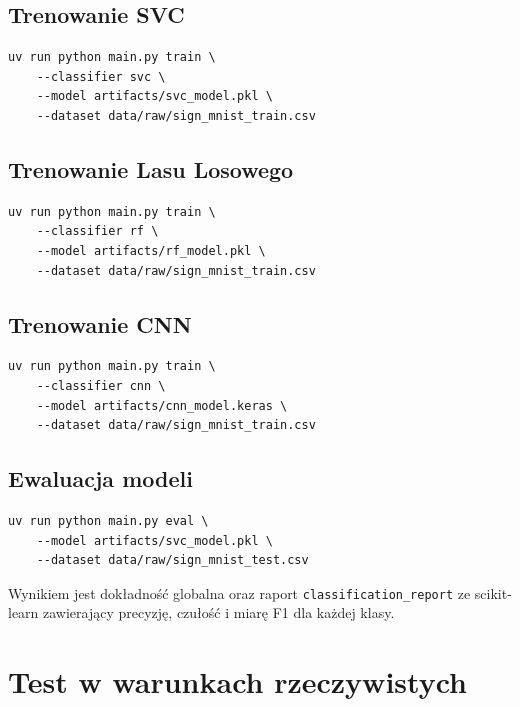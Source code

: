 \subsection{Trenowanie SVC}

\begin{lstlisting}[style=styleBash, caption={Polecenie trenowania klasyfikatora SVC}, label=lst:train-svc]
uv run python main.py train \
    --classifier svc \
    --model artifacts/svc_model.pkl \
    --dataset data/raw/sign_mnist_train.csv
\end{lstlisting}

\subsection{Trenowanie Lasu Losowego}

\begin{lstlisting}[style=styleBash, caption={Polecenie trenowania Lasu Losowego}, label=lst:train-rf]
uv run python main.py train \
    --classifier rf \
    --model artifacts/rf_model.pkl \
    --dataset data/raw/sign_mnist_train.csv
\end{lstlisting}

\subsection{Trenowanie CNN}

\begin{lstlisting}[style=styleBash, caption={Polecenie trenowania CNN}, label=lst:train-cnn]
uv run python main.py train \
    --classifier cnn \
    --model artifacts/cnn_model.keras \
    --dataset data/raw/sign_mnist_train.csv
\end{lstlisting}

\subsection{Ewaluacja modeli}

\begin{lstlisting}[style=styleBash, caption={Ewaluacja modelu SVC na zbiorze testowym}, label=lst:eval]
uv run python main.py eval \
    --model artifacts/svc_model.pkl \
    --dataset data/raw/sign_mnist_test.csv
\end{lstlisting}

Wynikiem jest dokładność globalna oraz raport \texttt{classification\_report}
ze scikit-learn zawierający precyzję, czułość i miarę F1 dla każdej klasy.

\section{Test w warunkach rzeczywistych}

